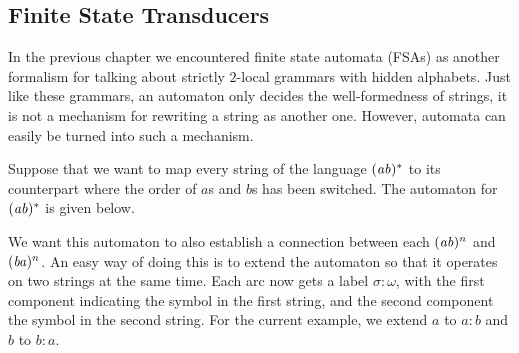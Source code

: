 \subsection{Finite State Transducers}

In the previous chapter we encountered finite state automata (FSAs) as another formalism for talking about strictly $2$-local grammars with hidden alphabets.
Just like these grammars, an automaton only decides the well-formedness of strings, it is not a mechanism for rewriting a string as another one.
However, automata can easily be turned into such a mechanism.

Suppose that we want to map every string of the language $(\mathit{ab})^*$ to its counterpart where the order of $a$s and $b$s has been switched.
The automaton for $(\mathit{ab})^*$ is given below.
%
\begin{center}
    
\end{center}
%
We want this automaton to also establish a connection between each $(\mathit{ab})^n$ and $(\mathit{ba})^n$.
An easy way of doing this is to extend the automaton so that it operates on two strings at the same time.
Each arc now gets a label $\sigma:\omega$, with the first component indicating the symbol in the first string, and the second component the symbol in the second string.
For the current example, we extend $a$ to $a:b$ and $b$ to $b:a$.
%
\begin{center}
    
\end{center}

